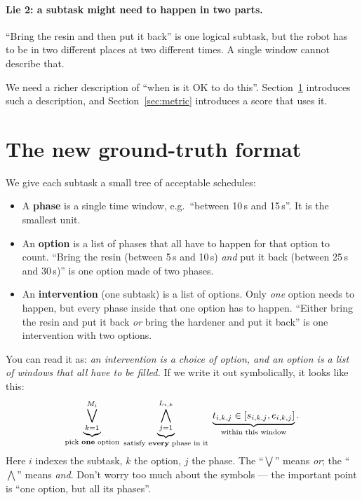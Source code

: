 \documentclass[11pt]{article}
\begin{document}
\paragraph{Lie 2: a subtask might need to happen in two parts.}
``Bring the resin and then put it back'' is one logical subtask, but
the robot has to be in two different places at two different times.
A single window cannot describe that.

We need a richer description of ``when is it OK to do this''.
Section~\ref{sec:gt} introduces such a description, and
Section~\ref{sec:metric} introduces a score that uses it.

\section{The new ground-truth format}
\label{sec:gt}

We give each subtask a small tree of acceptable schedules:

\begin{itemize}
  \item A \textbf{phase} is a single time window, e.g.\ ``between
    10\,s and 15\,s''. It is the smallest unit.
  \item An \textbf{option} is a list of phases that all have to
    happen for that option to count. ``Bring the resin (between 5\,s
    and 10\,s) \emph{and} put it back (between 25\,s and 30\,s)'' is
    one option made of two phases.
  \item An \textbf{intervention} (one subtask) is a list of options.
    Only \emph{one} option needs to happen, but every phase inside
    that one option has to happen. ``Either bring the resin and put
    it back \emph{or} bring the hardener and put it back'' is one
    intervention with two options.
\end{itemize}

\noindent
You can read it as: \emph{an intervention is a choice of option, and
an option is a list of windows that all have to be filled.} If we
write it out symbolically, it looks like this:
\begin{equation}
  \underbrace{\bigvee_{k=1}^{M_i}}_{\text{pick \textbf{one} option}} \;
  \underbrace{\bigwedge_{j=1}^{L_{i,k}}}_{\text{satisfy \textbf{every} phase in it}} \;
  \underbrace{t_{i,k,j} \in [s_{i,k,j}, e_{i,k,j}]}_{\text{within this window}}.
  \label{eq:dtn-constraint}
\end{equation}
Here $i$ indexes the subtask, $k$ the option, $j$ the phase. The
``$\bigvee$'' means \emph{or}; the ``$\bigwedge$'' means \emph{and}.
Don't worry too much about the symbols --- the important point is
``one option, but all its phases''.
\end{document}
